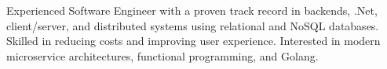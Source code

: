 

\begin{cvparagraph}

Experienced Software Engineer with a proven track record in backends, .Net, client/server, and distributed systems using relational and NoSQL databases. Skilled in reducing costs and improving user experience. Interested in modern microservice architectures, functional programming, and Golang.
\end{cvparagraph}
